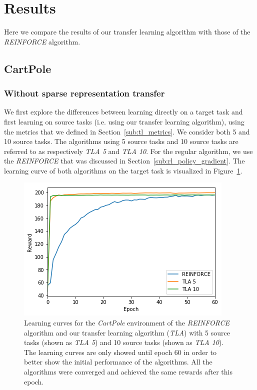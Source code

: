 \section{Results}
Here we compare the results of our transfer learning algorithm with those of the \textit{REINFORCE} algorithm.
\subsection{CartPole} %
\label{sub:cartpole}
\subsubsection{Without sparse representation transfer} %
\label{ssub:cartpole:without_sparse_representation_transfer}
We first explore the differences between learning directly on a target task and first learning on source tasks (i.e. using our transfer learning algorithm), using the metrics that we defined in Section~\ref{sub:tl_metrics}. We consider both 5 and 10 source tasks. The algorithms using 5 source tasks and 10 source tasks are referred to as respectively \textit{TLA 5} and \textit{TLA 10}.
For the regular algorithm, we use the \textit{REINFORCE} that was discussed in Section~\ref{sub:rl_policy_gradient}. The learning curve of both algorithms on the target task is visualized in Figure~\ref{fig:CartPole:reward_target_re-akt5-akt10}.
\begin{figure}[H]
    \centering
    \includegraphics[width=.8\linewidth]{images/results/CartPole/no_sparse_transfer/reward_target_re-akt5-akt10.png}
    \caption[Learning curves for \textit{REINFORCE} and \textit{TLA} for the \emph{CartPole} environment]{Learning curves for the \textit{CartPole} environment of the \textit{REINFORCE} algorithm and our transfer learning algorithm (\textit{TLA}) with 5 source tasks (shown as \textit{TLA 5}) and 10 source tasks (shown as \textit{TLA 10}). The learning curves are only showed until epoch 60 in order to better show the initial performance of the algorithms. All the algorithms were converged and achieved the same rewards after this epoch.}
    \label{fig:CartPole:reward_target_re-akt5-akt10}
\end{figure}

